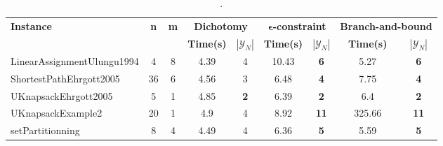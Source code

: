 \begin{table}[!h]
\centering
\hspace*{-1cm}\begin{tabular}{lcccccccc}
\toprule
\textbf{Instance} & \textbf{n} & \textbf{m} & \multicolumn{2}{c}{\textbf{Dichotomy}} & \multicolumn{2}{c}{\textbf{$\mathbf{\epsilon}$-constraint}}  & \multicolumn{2}{c}{\textbf{Branch-and-bound}}
\\
\cmidrule(r){4-5} \cmidrule(r){6-7} \cmidrule(r){8-9}
~ & ~ & ~ & \textbf{Time(s)} & \textbf{$|\mathcal{Y}_N|$} & \textbf{Time(s)} & \textbf{$|\mathcal{Y}_N|$} & \textbf{Time(s)} & \textbf{$|\mathcal{Y}_N|$} \\
\midrule

LinearAssignmentUlungu1994 & 4 & 8 &  \textcolor{blue2}{4.39} & 4 & 10.43 &  \textbf{6} & 5.27 &  \textbf{6} \\
ShortestPathEhrgott2005 & 36 & 6 &  \textcolor{blue2}{4.56} & 3 & 6.48 &  \textbf{4} & 7.75 &  \textbf{4} \\
UKnapsackEhrgott2005 & 5 & 1 &  \textcolor{blue2}{4.85} &  \textbf{2} & 6.39 &  \textbf{2} & 6.4 &  \textbf{2} \\
UKnapsackExample2 & 20 & 1 &  \textcolor{blue2}{4.9} & 4 & 8.92 &  \textbf{11} & 325.66 &  \textbf{11} \\
setPartitionning & 8 & 4 &  \textcolor{blue2}{4.49} & 4 & 6.36 &  \textbf{5} & 5.59 &  \textbf{5} \\
\bottomrule
\end{tabular}
\caption{.}
\label{tab:table_compare}
\end{table}

